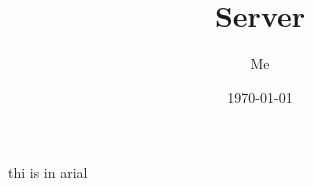 \documentclass{article}%
\title{Server}%
\author{Me}%
\date{\today}%
\begin{document}
%
\normalsize%
\maketitle%
\normalfont%
thi %
is %
in %
arial %
\end{document}
